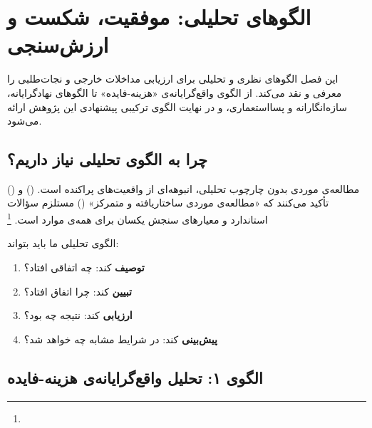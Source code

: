 \chapter{الگوهای تحلیلی: موفقیت، شکست و ارزش‌سنجی}
\label{ch:models}

\begin{tcolorbox}[mybox, title={چکیده‌ی فصل}]
این فصل الگوهای نظری و تحلیلی برای ارزیابی مداخلات خارجی و نجات‌طلبی را معرفی و نقد می‌کند. از الگوی واقع‌گرایانه‌ی «هزینه-فایده» تا الگوهای نهادگرایانه، سازه‌انگارانه و پسااستعماری، و در نهایت الگوی ترکیبی پیشنهادی این پژوهش ارائه می‌شود.
\end{tcolorbox}

\section{چرا به الگوی تحلیلی نیاز داریم؟}
\label{sec:ch03-why}

مطالعه‌ی موردی بدون چارچوب تحلیلی، انبوهه‌ای از واقعیت‌های پراکنده است.  () و  () تأکید می‌کنند که «مطالعه‌ی موردی ساختاریافته و متمرکز» () مستلزم سؤالات استاندارد و معیارهای سنجش یکسان برای همه‌ی موارد است.%
\footnote{}

الگوی تحلیلی ما باید بتواند:
\begin{enumerate}[nosep, label=\textbf{\arabic*.}]
  \item \textbf{توصیف} کند: چه اتفاقی افتاد؟
  \item \textbf{تبیین} کند: چرا اتفاق افتاد؟
  \item \textbf{ارزیابی} کند: نتیجه چه بود؟
  \item \textbf{پیش‌بینی} کند: در شرایط مشابه چه خواهد شد؟
\end{enumerate}

\section{الگوی ۱: تحلیل واقع‌گرایانه‌ی هزینه-فایده}
\label{sec:ch03-realist}


